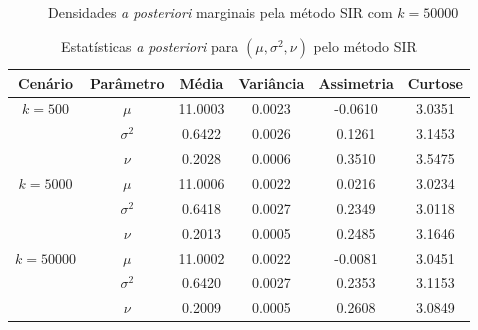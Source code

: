 \documentclass[9pt]{beamer}
\begin{document}
\begin{frame}
\begin{figure}[t]
\caption{Densidades \textit{a posteriori} marginais pela método SIR com $k = 50000$}%
\end{figure}
\end{frame}
\begin{frame}
\begin{table}[htb]
\caption{Estatísticas \textit{a posteriori} para $(\mu, \sigma^2, \nu)$ pelo método SIR}
\label{tab2}
\centering
\begin{tabular}{cccccc}
\toprule
Cenário & Parâmetro & Média & Variância & Assimetria & Curtose \\
\midrule
$k = 500$ & $\mu$      & 11.0003 & 0.0023 & -0.0610 & 3.0351 \\
& $\sigma^2$ &  0.6422 & 0.0026 &  0.1261 & 3.1453 \\
& $\nu$      &  0.2028 & 0.0006 &  0.3510 & 3.5475 \\
\midrule
$k = 5000$ & $\mu$      & 11.0006 & 0.0022 &  0.0216 & 3.0234 \\
& $\sigma^2$ &  0.6418 & 0.0027 &  0.2349 & 3.0118 \\
& $\nu$      &  0.2013 & 0.0005 &  0.2485 & 3.1646 \\
\midrule
$k = 50000$ & $\mu$      & 11.0002 & 0.0022 & -0.0081 & 3.0451 \\
& $\sigma^2$ &  0.6420 & 0.0027 &  0.2353 & 3.1153 \\
& $\nu$      &  0.2009 & 0.0005 &  0.2608 & 3.0849 \\
\bottomrule
\end{tabular}
\end{table}
\end{frame}
\end{document}
